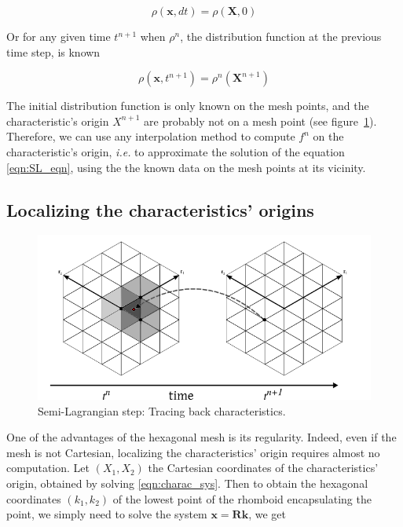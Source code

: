 \documentclass[proc]{edpsmath}
\begin{document}
\begin{equation}
	\rho(\mathbf{x}, dt) = \rho(\mathbf{X}, 0)
\end{equation}

Or for any given time $t^{n+1}$ when $\rho^n$, the distribution function at the previous time step, is known

\begin{equation}
\label{eqn:SL_eqn}
	\rho(\mathbf{x}, t^{n+1}) = \rho^n(\mathbf{X}^{n+1})
\end{equation}

The initial distribution function is only known on the mesh points, and the characteristic's origin $X^{n+1}$ are probably not on a mesh point (see figure~\ref{fig:SL_hex}). Therefore, we can use any interpolation method to compute $f^n$ on the characteristic's origin, \emph{i.e.} to approximate the solution of the equation \eqref{eqn:SL_eqn}, using the the known data on the mesh points at its vicinity.


\subsection{Localizing the characteristics' origins}


\begin{figure}[h!]
	\centering
	\includegraphics[scale=0.5]{figures/SL_hex.png} 
	\caption{Semi-Lagrangian step: Tracing back characteristics.}
	\label{fig:SL_hex}
\end{figure}


One of the advantages of the hexagonal mesh is its regularity. Indeed, even if the mesh is not Cartesian, localizing the characteristics' origin requires almost no computation. Let $(X_1, X_2)$ the Cartesian coordinates of the characteristics' origin, obtained by solving \eqref{eqn:charac_sys}. Then to obtain the hexagonal coordinates $(k_1, k_2)$ of the lowest point of the rhomboid encapsulating the point, we simply need to solve the system $\mathbf{x} = \mathbf{R} \mathbf{k}$, we get
\end{document}
